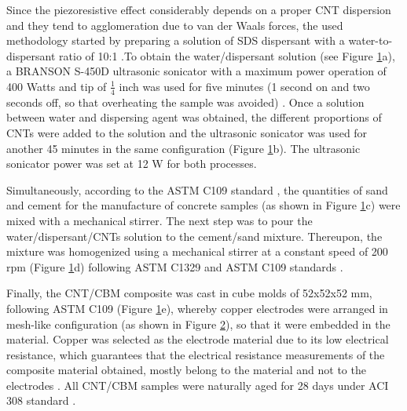 \documentclass[twocolumn]{bmcart}%
\begin{document}
Since the piezoresistive effect considerably depends on a proper CNT dispersion and they tend to agglomeration due to van der Waals forces, the used methodology started by preparing a solution of SDS dispersant with a water-to-dispersant ratio of 10:1 \cite{Shao2017, Noh2013, Lee2017, Collins2012}.To obtain the water/dispersant solution (see Figure \ref{fig1}a), a BRANSON S-450D ultrasonic sonicator  with a maximum power operation of 400 Watts and tip of $\frac{1}{4}$ inch was used for five minutes (1 second on and two seconds off, so that overheating the sample was  avoided) \cite{Konsta-gdoutos2010, Konsta-Gdoutos2014}. Once a solution between water and dispersing agent was obtained, the different proportions of CNTs were added to the solution and the ultrasonic sonicator was used for another 45 minutes in the same configuration (Figure \ref{fig1}b). The ultrasonic sonicator power was set at 12 W for both processes.

\begin{figure}[h!]
  \caption{
      }
   \label{fig1}
      \end{figure}



Simultaneously, according to the ASTM C109 standard \cite{Qiao2012}, the quantities of sand and cement for the manufacture of concrete samples (as shown in Figure \ref{fig1}c) were mixed with a mechanical stirrer. The next step was to pour the water/dispersant/CNTs solution to the cement/sand mixture.  Thereupon, the mixture was homogenized using a mechanical stirrer at a constant speed of 200 rpm (Figure \ref{fig1}d) following ASTM C1329 and ASTM C109 standards \cite{Collins2012, AmericanSocietyforTestingandMaterials2014}.

\begin{figure}[h!]
  \caption{
  \label{fig2}
      }
      \end{figure}


Finally, the  CNT/CBM composite was cast in cube molds of 52x52x52 mm, following ASTM C109 \cite{ASTMC1092000} (Figure \ref{fig1}e), whereby copper electrodes were arranged in mesh-like configuration (as shown in Figure \ref{fig2}), so that it were embedded in the material. Copper was selected as the electrode material due to its low electrical resistance, which guarantees that the electrical resistance measurements of the composite material obtained, mostly belong to the material and not to the electrodes \cite{Kim2016}. All CNT/CBM samples were naturally aged for 28 days under ACI 308 standard \cite{ACICommittee3082016}.
\end{document}
